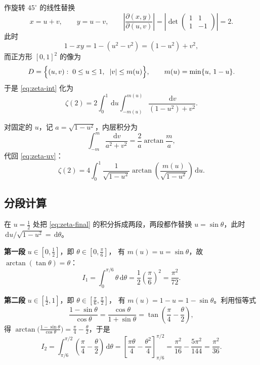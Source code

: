 \documentclass[11pt,a4paper]{ctexart}
\theoremstyle{definition}
\theoremstyle{remark}
\newcommand{\dd}{\,\mathrm{d}}
\newcommand{\abs}[1]{\left\lvert #1 \right\rvert}
\begin{document}
作旋转 $45^{\circ}$ 的线性替换
\begin{equation}
  x=u+v,\qquad y=u-v,
  \qquad
  \left\lvert\frac{\partial(x,y)}{\partial(u,v)}\right\rvert
  =\abs{\det\begin{pmatrix}1&1\\[2pt]1&-1\end{pmatrix}}=2 .
\end{equation}
此时
\begin{equation}
  1-xy=1-(u^{2}-v^{2})=(1-u^{2})+v^{2},
\end{equation}
而正方形 $[0,1]^{2}$ 的像为
\begin{equation}
  D=\Bigl\{(u,v):\; 0\le u\le 1,\;\; \abs{v}\le m(u)\Bigr\},
  \qquad m(u)=\min\{u,\,1-u\} .
\end{equation}
于是 \eqref{eq:zeta-int} 化为
\begin{equation}
  \zeta(2)=2\int_{0}^{1}\!\!\dd u\int_{-m(u)}^{m(u)}
  \frac{\dd v}{(1-u^{2})+v^{2}} .
  \label{eq:zeta-uv}
\end{equation}

对固定的 $u$，记 $a=\sqrt{1-u^{2}}$，内层积分为
\begin{equation}
  \int_{-m}^{m}\frac{\dd v}{a^{2}+v^{2}}
  =\frac{2}{a}\arctan\frac{m}{a},
\end{equation}
代回 \eqref{eq:zeta-uv}：
\begin{equation}
  \zeta(2)=4\int_{0}^{1}\frac{1}{\sqrt{1-u^{2}}}
  \arctan\!\left(\frac{m(u)}{\sqrt{1-u^{2}}}\right)\dd u .
  \label{eq:zeta-final}
\end{equation}

\subsection{分段计算}

在 $u=\tfrac12$ 处把 \eqref{eq:zeta-final} 的积分拆成两段，两段都作替换
$u=\sin\theta$，此时 $\dd u/\sqrt{1-u^{2}}=\dd\theta$。

\medskip
\noindent\textbf{第一段} $u\in[0,\tfrac12]$，即 $\theta\in[0,\tfrac{\pi}{6}]$，
有 $m(u)=u=\sin\theta$，故 $\arctan(\tan\theta)=\theta$：
\begin{equation}
  I_{1}=\int_{0}^{\pi/6}\theta\dd\theta
  =\frac{1}{2}\left(\frac{\pi}{6}\right)^{2}
  =\frac{\pi^{2}}{72}.
\end{equation}

\noindent\textbf{第二段} $u\in[\tfrac12,1]$，即 $\theta\in[\tfrac{\pi}{6},\tfrac{\pi}{2}]$，
有 $m(u)=1-u=1-\sin\theta$。利用恒等式
\begin{equation}
  \frac{1-\sin\theta}{\cos\theta}
  =\frac{\cos\theta}{1+\sin\theta}
  =\tan\!\left(\frac{\pi}{4}-\frac{\theta}{2}\right),
  \label{eq:halftan}
\end{equation}
得 $\arctan\!\bigl(\frac{1-\sin\theta}{\cos\theta}\bigr)=\frac{\pi}{4}-\frac{\theta}{2}$，于是
\begin{equation}
  I_{2}=\int_{\pi/6}^{\pi/2}\left(\frac{\pi}{4}-\frac{\theta}{2}\right)\dd\theta
  =\left[\frac{\pi\theta}{4}-\frac{\theta^{2}}{4}\right]_{\pi/6}^{\pi/2}
  =\frac{\pi^{2}}{16}-\frac{5\pi^{2}}{144}
  =\frac{\pi^{2}}{36}.
\end{equation}
\end{document}
